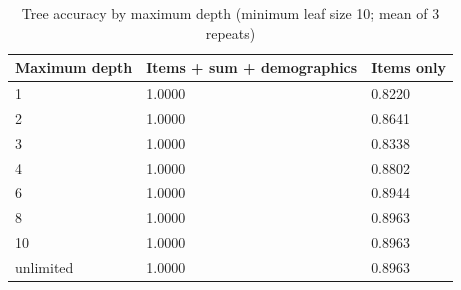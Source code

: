 \begin{table}
\caption{Tree accuracy by maximum depth (minimum leaf size 10; mean of 3 repeats)}
\label{tab:table4_tree_depth}
\begin{tabular}{lll}
\toprule
Maximum depth & Items + sum + demographics & Items only \\
\midrule
1 & 1.0000 & 0.8220 \\
2 & 1.0000 & 0.8641 \\
3 & 1.0000 & 0.8338 \\
4 & 1.0000 & 0.8802 \\
6 & 1.0000 & 0.8944 \\
8 & 1.0000 & 0.8963 \\
10 & 1.0000 & 0.8963 \\
unlimited & 1.0000 & 0.8963 \\
\bottomrule
\end{tabular}
\end{table}
